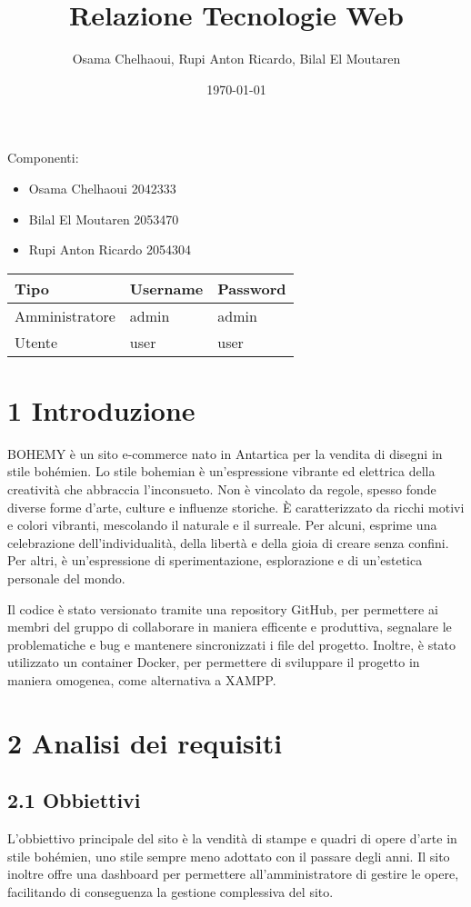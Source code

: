 \documentclass[11pt]{article}
\author{Osama Chelhaoui, Rupi Anton Ricardo, Bilal El Moutaren}
\date{\today}
\title{Relazione Tecnologie Web}
\begin{document}
\maketitle
\tableofcontents

Componenti:
\begin{itemize}
\item Osama Chelhaoui 2042333
\item Bilal El Moutaren 2053470
\item Rupi Anton Ricardo 2054304
\end{itemize}

\begin{center}
\begin{tabular}{lll}
Tipo & Username & Password\\[0pt]
\hline
Amministratore & admin & admin\\[0pt]
Utente & user & user\\[0pt]
\end{tabular}
\end{center}
\section{1 Introduzione}
\label{sec:org164a95c}
BOHEMY è un sito e-commerce nato in Antartica per la vendita di disegni in stile bohémien. Lo stile bohemian è un'espressione vibrante ed elettrica della creatività che abbraccia l'inconsueto. Non è vincolato da regole, spesso fonde diverse forme d'arte, culture e influenze storiche. È caratterizzato da ricchi motivi e colori vibranti, mescolando il naturale e il surreale. Per alcuni, esprime una celebrazione dell'individualità, della libertà e della gioia di creare senza confini. Per altri, è un'espressione di sperimentazione, esplorazione e di un'estetica personale del mondo.

Il codice è stato versionato tramite una repository GitHub, per permettere ai membri del gruppo di collaborare in maniera efficente e produttiva, segnalare le problematiche e bug e mantenere sincronizzati i file del progetto. Inoltre, è stato utilizzato un container Docker, per permettere di sviluppare il progetto in maniera omogenea, come alternativa a XAMPP.
\section{2 Analisi dei requisiti}
\label{sec:orgf3aaaf7}
\subsection{2.1 Obbiettivi}
\label{sec:org4409768}
L'obbiettivo principale del sito è la vendità di stampe e quadri di opere d'arte in stile bohémien, uno stile sempre meno adottato con il passare degli anni. Il sito inoltre offre una dashboard per permettere all'amministratore di gestire le opere, facilitando di conseguenza la gestione complessiva del sito.
\end{document}
